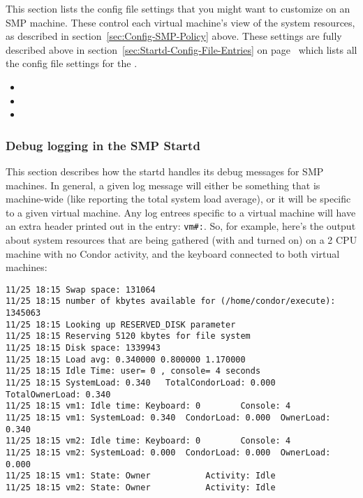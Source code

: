 This section lists the config file settings that you might want to
customize on an SMP machine.  
These control each virtual machine's view of the system resources, as
described in section~\ref{sec:Config-SMP-Policy} above.
These settings are fully described above in
section~\ref{sec:Startd-Config-File-Entries} on
page~\pageref{sec:Startd-Config-File-Entries} which lists all the
config file settings for the .
\begin{itemize}
\item {}
\item {}
\item {}
\end{itemize}

\subsubsection{\label{sec:SMP-logging}
Debug logging in the SMP Startd}

This section describes how the startd handles its debug messages for
SMP machines.
In general, a given log message will either be something that is
machine-wide (like reporting the total system load average), or it
will be specific to a given virtual machine.
Any log entrees specific to a virtual machine will have an extra
header printed out in the entry: \texttt{vm\#:}.  
So, for example, here's the output about system resources that are
being gathered (with  and  turned on) on
a 2 CPU machine with no Condor activity, and the keyboard connected to
both virtual machines:
\begin{verbatim}
11/25 18:15 Swap space: 131064
11/25 18:15 number of kbytes available for (/home/condor/execute): 1345063
11/25 18:15 Looking up RESERVED_DISK parameter
11/25 18:15 Reserving 5120 kbytes for file system
11/25 18:15 Disk space: 1339943
11/25 18:15 Load avg: 0.340000 0.800000 1.170000
11/25 18:15 Idle Time: user= 0 , console= 4 seconds
11/25 18:15 SystemLoad: 0.340   TotalCondorLoad: 0.000  TotalOwnerLoad: 0.340
11/25 18:15 vm1: Idle time: Keyboard: 0        Console: 4
11/25 18:15 vm1: SystemLoad: 0.340  CondorLoad: 0.000  OwnerLoad: 0.340
11/25 18:15 vm2: Idle time: Keyboard: 0        Console: 4
11/25 18:15 vm2: SystemLoad: 0.000  CondorLoad: 0.000  OwnerLoad: 0.000
11/25 18:15 vm1: State: Owner           Activity: Idle
11/25 18:15 vm2: State: Owner           Activity: Idle
\end{verbatim}

